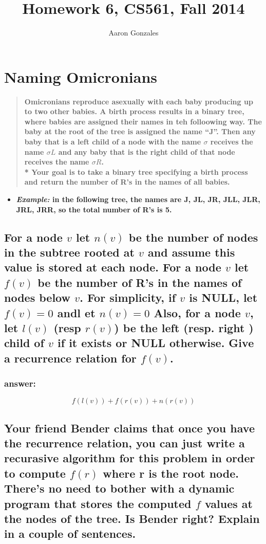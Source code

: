 \documentclass[titlepage]{article}\usepackage[]{graphicx}\usepackage[]{color}
\theoremstyle{definition}
\begin{document}
\title{Homework 6, CS561, Fall 2014}
\author{Aaron Gonzales}
\maketitle

\section{Naming Omicronians}
\begin{quote}
  \textbf{Omicronians reproduce asexually with each baby producing up to two
  other babies. A birth process results in a binary tree, where babies are
  assigned their names in teh folloowing way. The baby at the root of the tree
  is assigned the name ``J''. Then any baby that is a left child of a node with
  the name $\sigma$ receives the name $\sigma L$ and any baby that is the right
  child of that node receives the name $\sigma R$. \\*
  Your goal is to take a binary tree specifying a birth process and return the
  number of R's in the names of all babies.}
\end{quote}
\begin{itemize}
	\item \textbf{\emph{Example:} in the following tree, the names are J, JL,
	JR, JLL, JLR, JRL, JRR, so the total number of R's is 5.  }
\end{itemize}

\subsection{For a node $v$ let $n(v)$ be the number of nodes in the subtree
	rooted at $v$ and assume this value is stored at each node. For a node $v$
	let $f(v)$ be the number of R's in the names of nodes below $v$. For
	simplicity, if $v$ is NULL, let $f(v) = 0$ andl et $n(v) = 0$ Also, for a
	node $v$, let $l(v)$ (resp $r(v)$) be the left (resp. right ) child of $v$
	if it exists or NULL otherwise. Give a recurrence relation for $f(v)$.}
\subsubsection{answer:}
\[ f\left( l (v) \right) + f\left( r (v) \right) + n\left( r(v) \right) \]

\vspace{5cm}

\subsection{Your friend Bender claims that once you have the recurrence
	relation, you can just write a recurasive algorithm for this problem in
	order to compute $f(r)$ where r is the root node. There's no need to bother
	with a dynamic program that stores the computed $f$ values at the nodes of
	the tree. Is Bender right? Explain in a couple of sentences.}
\end{document}
